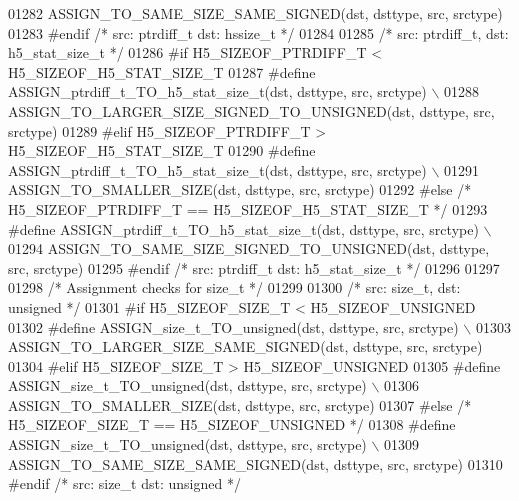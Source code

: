 \begin{DoxyCode}
01282 \textcolor{preprocessor}{        ASSIGN\_TO\_SAME\_SIZE\_SAME\_SIGNED(dst, dsttype, src, srctype)}
01283 \textcolor{preprocessor}{#endif }\textcolor{comment}{/* src: ptrdiff\_t dst: hssize\_t */}\textcolor{preprocessor}{}
01284 
01285 \textcolor{comment}{/* src: ptrdiff\_t, dst: h5\_stat\_size\_t */}
01286 \textcolor{preprocessor}{#if H5\_SIZEOF\_PTRDIFF\_T < H5\_SIZEOF\_H5\_STAT\_SIZE\_T}
01287 \textcolor{preprocessor}{    #define ASSIGN\_ptrdiff\_t\_TO\_h5\_stat\_size\_t(dst, dsttype, src, srctype) \(\backslash\)}
01288 \textcolor{preprocessor}{        ASSIGN\_TO\_LARGER\_SIZE\_SIGNED\_TO\_UNSIGNED(dst, dsttype, src, srctype)}
01289 \textcolor{preprocessor}{#elif H5\_SIZEOF\_PTRDIFF\_T > H5\_SIZEOF\_H5\_STAT\_SIZE\_T}
01290 \textcolor{preprocessor}{    #define ASSIGN\_ptrdiff\_t\_TO\_h5\_stat\_size\_t(dst, dsttype, src, srctype) \(\backslash\)}
01291 \textcolor{preprocessor}{        ASSIGN\_TO\_SMALLER\_SIZE(dst, dsttype, src, srctype)}
01292 \textcolor{preprocessor}{#else }\textcolor{comment}{/* H5\_SIZEOF\_PTRDIFF\_T == H5\_SIZEOF\_H5\_STAT\_SIZE\_T */}\textcolor{preprocessor}{}
01293 \textcolor{preprocessor}{    #define ASSIGN\_ptrdiff\_t\_TO\_h5\_stat\_size\_t(dst, dsttype, src, srctype) \(\backslash\)}
01294 \textcolor{preprocessor}{        ASSIGN\_TO\_SAME\_SIZE\_SIGNED\_TO\_UNSIGNED(dst, dsttype, src, srctype)}
01295 \textcolor{preprocessor}{#endif }\textcolor{comment}{/* src: ptrdiff\_t dst: h5\_stat\_size\_t */}\textcolor{preprocessor}{}
01296 
01297 
01298 \textcolor{comment}{/* Assignment checks for size\_t */}
01299 
01300 \textcolor{comment}{/* src: size\_t, dst: unsigned */}
01301 \textcolor{preprocessor}{#if H5\_SIZEOF\_SIZE\_T < H5\_SIZEOF\_UNSIGNED}
01302 \textcolor{preprocessor}{    #define ASSIGN\_size\_t\_TO\_unsigned(dst, dsttype, src, srctype) \(\backslash\)}
01303 \textcolor{preprocessor}{        ASSIGN\_TO\_LARGER\_SIZE\_SAME\_SIGNED(dst, dsttype, src, srctype)}
01304 \textcolor{preprocessor}{#elif H5\_SIZEOF\_SIZE\_T > H5\_SIZEOF\_UNSIGNED}
01305 \textcolor{preprocessor}{    #define ASSIGN\_size\_t\_TO\_unsigned(dst, dsttype, src, srctype) \(\backslash\)}
01306 \textcolor{preprocessor}{        ASSIGN\_TO\_SMALLER\_SIZE(dst, dsttype, src, srctype)}
01307 \textcolor{preprocessor}{#else }\textcolor{comment}{/* H5\_SIZEOF\_SIZE\_T == H5\_SIZEOF\_UNSIGNED */}\textcolor{preprocessor}{}
01308 \textcolor{preprocessor}{    #define ASSIGN\_size\_t\_TO\_unsigned(dst, dsttype, src, srctype) \(\backslash\)}
01309 \textcolor{preprocessor}{        ASSIGN\_TO\_SAME\_SIZE\_SAME\_SIGNED(dst, dsttype, src, srctype)}
01310 \textcolor{preprocessor}{#endif }\textcolor{comment}{/* src: size\_t dst: unsigned */}\textcolor{preprocessor}{}

\end{DoxyCode}
